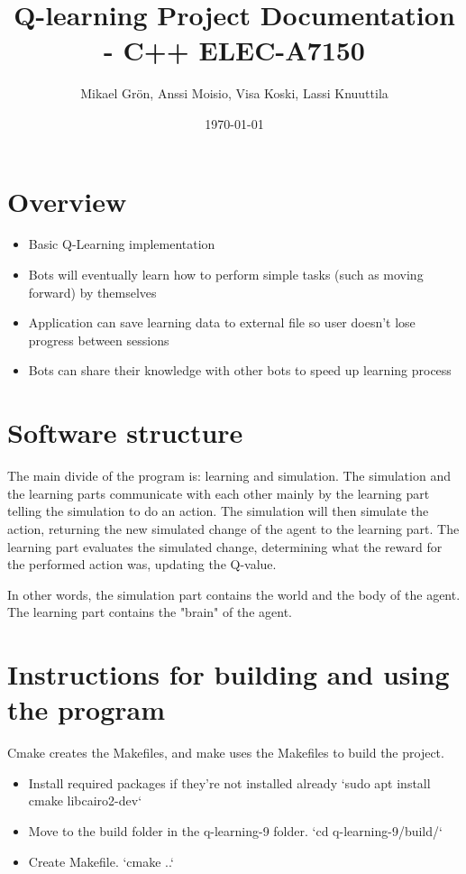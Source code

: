\documentclass{article}
\author{Mikael Grön, Anssi Moisio, Visa Koski, Lassi Knuuttila}
\title{Q-learning Project Documentation - C++ ELEC-A7150}
\date{\today}
\begin{document}
\maketitle

\tableofcontents
\newpage

\section{Overview}

\begin{itemize}
  \item Basic Q-Learning implementation
  \item Bots will eventually learn how to perform simple
  tasks (such as moving forward) by themselves
  \item Application can save learning data to external file so user
  doesn't lose progress between sessions
  \item Bots can share their knowledge with other bots to speed up learning
  process
\end{itemize}

\section{Software structure}

The main divide of the program is: learning and simulation. The
simulation and the learning parts communicate with each other mainly by the
learning part telling the simulation to do an action. The simulation will then
simulate the action, returning the new simulated change of the agent to the
learning part. The learning part evaluates the simulated change, determining
what the reward for the performed action was, updating the Q-value.

In other words, the simulation part contains the world and the body of the
agent. The learning part contains the "brain" of the agent.


\section{Instructions for building and using the program}

Cmake creates the Makefiles, and make uses the Makefiles to build the project.

\begin{itemize}
  \item Install required packages if they're not installed already
  `sudo apt install cmake libcairo2-dev`

  \item Move to the build folder in the q-learning-9 folder.
  `cd q-learning-9/build/`

  \item Create Makefile.
  `cmake ..`
\end{itemize}
\end{document}

